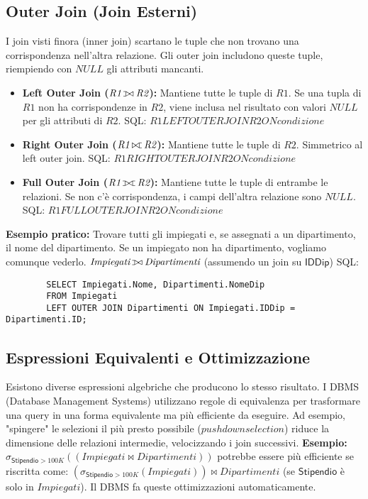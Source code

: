 \documentclass{article}
\newcommand{\Rel}[1]{\textit{#1}} %
\newcommand{\Attr}[1]{\textsf{#1}} %
\newcommand{\myselectop}[2]{\sigma_{#1}(#2)}
\newcommand{\mynaturaljoin}{\bowtie} %
\def\ojoin{\setbox0=\hbox{$\mynaturaljoin$}%
	\rule[-.02ex]{.25em}{.4pt}\llap{\rule[\ht0]{.25em}{.4pt}}}
\newcommand{\myleftouterjoin}{\mathbin{\ojoin\mkern-5.8mu\mynaturaljoin}}
\newcommand{\myrightouterjoin}{\mathbin{\mynaturaljoin\mkern-5.8mu\ojoin}}
\newcommand{\myfullouterjoin}{\mathbin{\ojoin\mkern-5.8mu\mynaturaljoin\mkern-5.8mu\ojoin}}
\begin{document}
	\subsection{Outer Join (Join Esterni)}
	I join visti finora (inner join) scartano le tuple che non trovano una corrispondenza nell'altra relazione. Gli outer join includono queste tuple, riempiendo con $NULL$ gli attributi mancanti.
	\begin{itemize}
		\item \textbf{Left Outer Join ($\Rel{R1} \myleftouterjoin \Rel{R2}$):} Mantiene tutte le tuple di $\Rel{R1}$. Se una tupla di $\Rel{R1}$ non ha corrispondenze in $\Rel{R2}$, viene inclusa nel risultato con valori $NULL$ per gli attributi di $\Rel{R2}$.
		SQL: $R1 LEFT OUTER JOIN R2 ON condizione$
		\item \textbf{Right Outer Join ($\Rel{R1} \myrightouterjoin \Rel{R2}$):} Mantiene tutte le tuple di $\Rel{R2}$. Simmetrico al left outer join.
		SQL: $R1 RIGHT OUTER JOIN R2 ON condizione$
		\item \textbf{Full Outer Join ($\Rel{R1} \myfullouterjoin \Rel{R2}$):} Mantiene tutte le tuple di entrambe le relazioni. Se non c'è corrispondenza, i campi dell'altra relazione sono $NULL$.
		SQL: $R1 FULL OUTER JOIN R2 ON condizione$
	\end{itemize}
	\textbf{Esempio pratico:} Trovare tutti gli impiegati e, se assegnati a un dipartimento, il nome del dipartimento. Se un impiegato non ha dipartimento, vogliamo comunque vederlo.
	$\Rel{Impiegati} \myleftouterjoin \Rel{Dipartimenti}$ (assumendo un join su $\Attr{IDDip}$)
	SQL:
	\begin{verbatim}
		SELECT Impiegati.Nome, Dipartimenti.NomeDip
		FROM Impiegati
		LEFT OUTER JOIN Dipartimenti ON Impiegati.IDDip = Dipartimenti.ID;
	\end{verbatim}
	
	\subsection{Espressioni Equivalenti e Ottimizzazione}
	Esistono diverse espressioni algebriche che producono lo stesso risultato. I DBMS (Database Management Systems) utilizzano regole di equivalenza per trasformare una query in una forma equivalente ma più efficiente da eseguire.
	Ad esempio, "spingere" le selezioni il più presto possibile ($pushdown selection$) riduce la dimensione delle relazioni intermedie, velocizzando i join successivi.
	\textbf{Esempio:}
	$\myselectop{\Attr{Stipendio}>100K}{(\Rel{Impiegati} \mynaturaljoin \Rel{Dipartimenti})}$
	potrebbe essere più efficiente se riscritta come:
	$(\myselectop{\Attr{Stipendio}>100K}{\Rel{Impiegati}}) \mynaturaljoin \Rel{Dipartimenti}$
	(se $\Attr{Stipendio}$ è solo in $\Rel{Impiegati}$). Il DBMS fa queste ottimizzazioni automaticamente.
	
\end{document}
